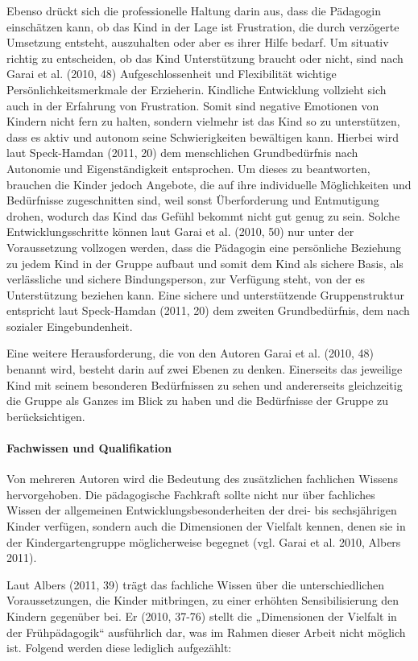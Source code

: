 Ebenso drückt sich die professionelle Haltung darin aus, dass die Pädagogin einschätzen kann, ob das Kind in der Lage ist Frustration, die durch verzögerte Umsetzung entsteht, auszuhalten oder aber es ihrer Hilfe bedarf. Um situativ richtig zu entscheiden, ob das Kind Unterstützung braucht oder nicht, sind nach Garai et al. (2010, 48) Aufgeschlossenheit und Flexibilität wichtige Persönlichkeitsmerkmale der Erzieherin. Kindliche Entwicklung vollzieht sich auch in der Erfahrung von Frustration. Somit sind negative Emotionen von Kindern nicht fern zu halten, sondern vielmehr ist das Kind so zu unterstützen, dass es aktiv und autonom seine Schwierigkeiten bewältigen kann.
Hierbei wird laut Speck-Hamdan (2011, 20) dem menschlichen Grundbedürfnis nach Autonomie und Eigenständigkeit entsprochen. Um dieses zu beantworten, brauchen die Kinder jedoch Angebote, die auf ihre individuelle Möglichkeiten und Bedürfnisse zugeschnitten sind, weil sonst Überforderung und Entmutigung drohen, wodurch das Kind das Gefühl bekommt nicht gut genug zu sein. Solche Entwicklungsschritte können laut Garai et al. (2010, 50) nur unter der Voraussetzung vollzogen werden, dass die Pädagogin eine persönliche Beziehung zu jedem Kind in der Gruppe aufbaut und somit dem Kind als sichere Basis, als verlässliche und sichere Bindungsperson, zur Verfügung steht, von der es Unterstützung beziehen kann. Eine sichere und unterstützende Gruppenstruktur entspricht laut Speck-Hamdan (2011, 20) dem zweiten Grundbedürfnis, dem nach sozialer Eingebundenheit. 
   
Eine weitere Herausforderung, die von den Autoren Garai et al. (2010, 48) benannt wird, besteht darin auf zwei Ebenen zu denken. Einerseits das jeweilige Kind mit seinem besonderen Bedürfnissen zu sehen und andererseits gleichzeitig die Gruppe als Ganzes im Blick zu haben und die Bedürfnisse der Gruppe zu berücksichtigen.  

\paragraph{Fachwissen und Qualifikation}
Von mehreren Autoren wird die Bedeutung des zusätzlichen fachlichen Wissens hervorgehoben. Die pädagogische Fachkraft sollte nicht nur über fachliches Wissen der allgemeinen Entwicklungsbesonderheiten der drei- bis sechs\-jährigen Kinder verfügen, sondern auch die Dimensionen der Vielfalt kennen, denen sie in der Kindergartengruppe möglicherweise begegnet (vgl. Garai et al. 2010, Albers 2011). 

Laut Albers (2011, 39) trägt das fachliche Wissen über die unterschiedlichen Voraussetzungen, die Kinder mitbringen, zu einer erhöhten Sensibilisierung den Kindern gegenüber bei. Er (2010, 37-76) stellt die „Dimensionen der Vielfalt in der Frühpädagogik“ ausführlich dar, was im Rahmen dieser Arbeit nicht möglich ist. Folgend werden diese lediglich aufgezählt: 

